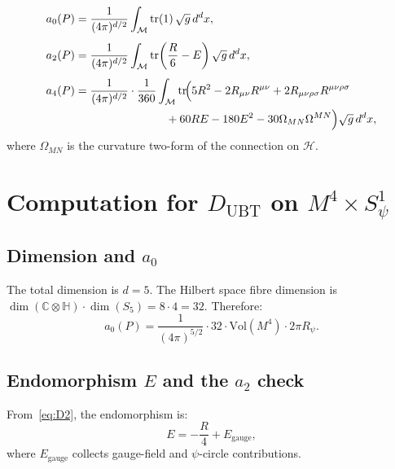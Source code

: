 \documentclass[12pt,a4paper]{article}
\theoremstyle{definition}
\theoremstyle{remark}
\begin{document}
\begin{align}
  a_0(P)
  &= \frac{1}{(4\pi)^{d/2}} \int_{\mathcal{M}}
     \mathrm{tr}(1)\,\sqrt{g}\,d^dx,
  \label{eq:a0}\\[4pt]
  a_2(P)
  &= \frac{1}{(4\pi)^{d/2}} \int_{\mathcal{M}}
     \mathrm{tr}\!\left(\frac{R}{6} - E\right)\sqrt{g}\,d^dx,
  \label{eq:a2}\\[4pt]
  a_4(P)
  &= \frac{1}{(4\pi)^{d/2}} \cdot \frac{1}{360}\int_{\mathcal{M}}
     \mathrm{tr}\!\Big(
       5R^2 - 2R_{\mu\nu}R^{\mu\nu} + 2R_{\mu\nu\rho\sigma}R^{\mu\nu\rho\sigma}
       \notag\\
  &\qquad\qquad\qquad\qquad
       + 60RE - 180E^2 - 30\Omega_{MN}\Omega^{MN}
     \Big)\sqrt{g}\,d^dx,
  \label{eq:a4}
\end{align}
where $\Omega_{MN}$ is the curvature two-form of the connection on $\mathcal{H}$.

\section{Computation for $D_{\mathrm{UBT}}$ on $M^4\times S^1_\psi$}
\label{sec:computation}

\subsection{Dimension and $a_0$}

The total dimension is $d=5$.
The Hilbert space fibre dimension is
$\dim(\mathbb{C}\otimes\mathbb{H})\cdot\dim(S_5) = 8\cdot 4 = 32$.
Therefore:
\begin{equation}
  a_0(P) = \frac{1}{(4\pi)^{5/2}}
  \cdot 32 \cdot \mathrm{Vol}(M^4) \cdot 2\pi R_\psi.
  \label{eq:a0_result}
\end{equation}

\subsection{Endomorphism $E$ and the $a_2$ check}

From~\eqref{eq:D2}, the endomorphism is:
\begin{equation}
  E = -\frac{R}{4} + E_{\mathrm{gauge}},
  \label{eq:E_form}
\end{equation}
where $E_{\mathrm{gauge}}$ collects gauge-field and $\psi$-circle contributions.
\end{document}
